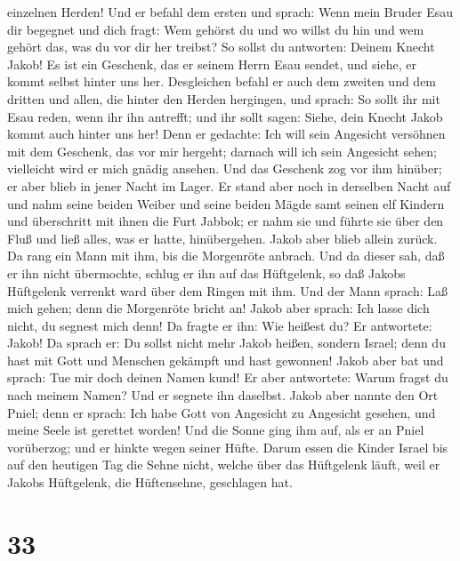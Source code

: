 einzelnen Herden!  Und er befahl dem ersten und sprach:
Wenn mein Bruder Esau dir begegnet und dich fragt: Wem gehörst du und wo
willst du hin und wem gehört das, was du vor dir her treibst?
 So sollst du antworten: Deinem Knecht Jakob! Es ist ein
Geschenk, das er seinem Herrn Esau sendet, und siehe, er kommt selbst
hinter uns her.  Desgleichen befahl er auch dem zweiten
und dem dritten und allen, die hinter den Herden hergingen, und sprach:
So sollt ihr mit Esau reden, wenn ihr ihn antrefft;  und
ihr sollt sagen: Siehe, dein Knecht Jakob kommt auch hinter uns her!
Denn er gedachte: Ich will sein Angesicht versöhnen mit dem Geschenk,
das vor mir hergeht; darnach will ich sein Angesicht sehen; vielleicht
wird er mich gnädig ansehen.  Und das Geschenk zog vor
ihm hinüber; er aber blieb in jener Nacht im Lager.  Er
stand aber noch in derselben Nacht auf und nahm seine beiden Weiber und
seine beiden Mägde samt seinen elf Kindern und überschritt mit ihnen die
Furt Jabbok;  er nahm sie und führte sie über den Fluß
und ließ alles, was er hatte, hinübergehen.  Jakob aber
blieb allein zurück. Da rang ein Mann mit ihm, bis die Morgenröte
anbrach.  Und da dieser sah, daß er ihn nicht übermochte,
schlug er ihn auf das Hüftgelenk, so daß Jakobs Hüftgelenk verrenkt ward
über dem Ringen mit ihm.  Und der Mann sprach: Laß mich
gehen; denn die Morgenröte bricht an! Jakob aber sprach: Ich lasse dich
nicht, du segnest mich denn!  Da fragte er ihn: Wie
heißest du? Er antwortete: Jakob!  Da sprach er: Du
sollst nicht mehr Jakob heißen, sondern Israel; denn du hast mit Gott
und Menschen gekämpft und hast gewonnen!  Jakob aber bat
und sprach: Tue mir doch deinen Namen kund! Er aber antwortete: Warum
fragst du nach meinem Namen? Und er segnete ihn daselbst.
 Jakob aber nannte den Ort Pniel; denn er sprach: Ich
habe Gott von Angesicht zu Angesicht gesehen, und meine Seele ist
gerettet worden!  Und die Sonne ging ihm auf, als er an
Pniel vorüberzog; und er hinkte wegen seiner Hüfte. 
Darum essen die Kinder Israel bis auf den heutigen Tag die Sehne nicht,
welche über das Hüftgelenk läuft, weil er Jakobs Hüftgelenk, die
Hüftensehne, geschlagen hat.

\hypertarget{section-32}{%
\section{33}\label{section-32}}

